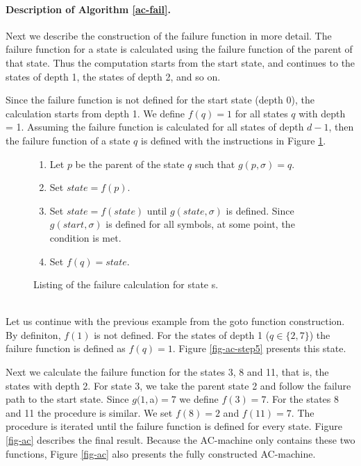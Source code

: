\documentclass[english,twoside,censored,csm,algorithms-track-2020]{HYthesisML}
\theoremstyle{plain}
\theoremstyle{definition}
\begin{document}
  \paragraph{Description of Algorithm \ref{ac-fail}.}  
  Next we describe the construction of the failure function in more detail. The failure function
  for a state is calculated using the failure function of the parent of that state. Thus the computation
  starts from the start state, and continues to the states of depth 1, the states of depth 2, and so on.

  Since the failure function is not defined for the start state (depth 0), the calculation starts
  from depth 1. We define $f(q)=1$ for all states $q$ with depth = 1. Assuming the failure function is
  calculated for all states of depth $d-1$, then the failure function of a state $q$ is defined with the
  instructions in Figure \ref{lst-failure-calculation}.
  
  \begin{figure}[b]
  \begin{enumerate}
  \item Let $p$ be the parent of the state $q$ such that $g(p,\sigma) = q$.
  \item Set $state = f(p)$.
  \item Set $state = f(state)$ until $g(state,\sigma)$ is defined. Since $g(start,\sigma)$ is defined
    for all symbols, at some point, the condition is met.
  \item Set $f(q) = state$.
  \end{enumerate}
   \caption{Listing of the failure calculation for state s.} \label{lst-failure-calculation}    
  \end{figure}

  \begin{testexample}[]~\label{exmp-fail}\\
    Let us continue with the previous example from the goto function construction. By definiton, $f(1)$
    is not defined. For the states of depth 1 ($q\in\{2,7\}$) the failure function is defined as
    $f(q)=1$. Figure \ref{fig-ac-step5} presents this state.

  Next we calculate the failure function for the states 3, 8 and 11, that is, the states with depth 2.
  For state 3, we take the parent state 2 and follow the failure path to the start state. Since
  $g(1,$a$) = 7$ we define $f(3)=7$. For the states 8 and 11 the procedure is similar. We set 
  $f(8)=2$ and $f(11)=7$. The procedure is iterated until the failure function is defined for every
  state. Figure \ref{fig-ac} describes the final result. Because the AC-machine only contains these
  two functions, Figure \ref{fig-ac} also presents the fully constructed AC-machine.
  \end{testexample}
\end{document}
